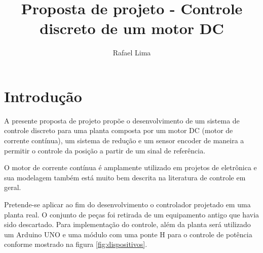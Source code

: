\documentclass[a4paper,11pt]{article}
\title{Proposta de projeto - Controle discreto de um motor DC} %
\author{Rafael Lima}
\begin{document}

\section{Introdução}

A presente proposta de projeto propõe o desenvolvimento de um sistema de controle discreto para uma planta composta por um motor DC (motor de corrente contínua), um sistema de redução e um sensor encoder de maneira a permitir o controle da posição a partir de um sinal de referência.

O motor de corrente contínua é amplamente utilizado em projetos de eletrônica e sua modelagem também está muito bem descrita na literatura de controle em geral. 

Pretende-se aplicar ao fim do desenvolvimento o controlador projetado em uma planta real. O conjunto de peças foi retirada de um equipamento antigo que havia sido descartado. Para implementação do controle, além da planta será utilizado um Arduino UNO e uma módulo com uma ponte H para o controle de potência conforme mostrado na figura \ref{fig:dispositivos}.
\end{document}
